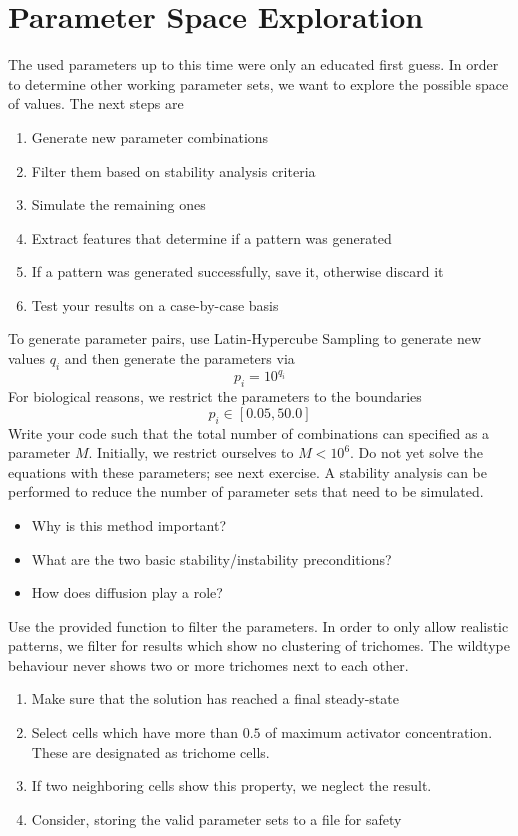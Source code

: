 \section{Parameter Space Exploration}
The used parameters up to this time were only an educated first guess.
In order to determine other working parameter sets, we want to explore the possible space of values.
The next steps are
\begin{enumerate}
    \item Generate new parameter combinations
    \item Filter them based on stability analysis criteria
    \item Simulate the remaining ones
    \item Extract features that determine if a pattern was generated
    \item If a pattern was generated successfully, save it, otherwise discard it
    \item Test your results on a case-by-case basis
\end{enumerate}
%
%
To generate parameter pairs, use Latin-Hypercube Sampling to generate new values $q_i$ and then generate the parameters via
\begin{equation}
    p_i = 10^{q_i}
\end{equation}
For biological reasons, we restrict the parameters to the boundaries
\begin{equation}
    p_i \in [0.05, 50.0]
\end{equation}
Write your code such that the total number of combinations can specified as a parameter $M$.
Initially, we restrict ourselves to $M<10^6$.
Do not yet solve the equations with these parameters; see next exercise.
%
%
A stability analysis can be performed to reduce the number of parameter sets that need to be simulated.
\begin{itemize}
    \item Why is this method important?
    \item What are the two basic stability/instability preconditions?
    \item How does diffusion play a role?
\end{itemize}
Use the provided function to filter the parameters.
%
%
In order to only allow realistic patterns, we filter for results which show no clustering of trichomes.
The wildtype behaviour never shows two or more trichomes next to each other.
\begin{enumerate}
    \item Make sure that the solution has reached a final steady-state
    \item Select cells which have more than $0.5$ of maximum activator concentration.
    These are designated as trichome cells.
    \item If two neighboring cells show this property, we neglect the result.
    \item Consider, storing the valid parameter sets to a file for safety   
\end{enumerate}
